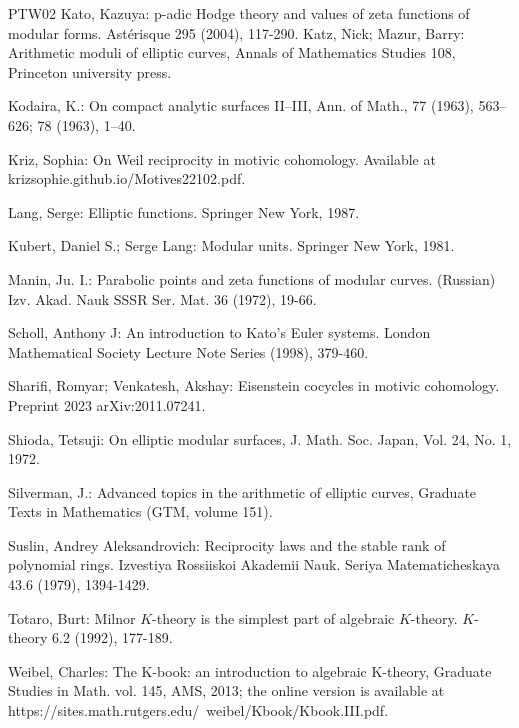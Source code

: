 \documentclass[12pt,amstex,amssymb]{article}
\theoremstyle{plain}
\theoremstyle{definition}
\def\Z{{\mathbb Z}}
\newcommand{\GL}{\operatorname{GL}}
\begin{document}
{\begin{thebibliography}{PTW02}
Kato, Kazuya:  p-adic Hodge theory and values of zeta functions of modular forms. Ast\'erisque 295 (2004), 117-290.
Katz, Nick; Mazur, Barry: Arithmetic moduli of elliptic curves, Annals of Mathematics Studies 108, Princeton university press.

Kodaira, K.: On compact analytic surfaces II--III, Ann. of Math., 77 (1963), 563--626; 78 (1963), 1--40.

Kriz, Sophia: On Weil reciprocity in motivic cohomology. Available at  krizsophie.github.io/Motives22102.pdf. 

Lang, Serge: Elliptic functions. Springer New York, 1987.

Kubert, Daniel S.; Serge Lang: Modular units. Springer New York, 1981.

Manin, Ju. I.:
Parabolic points and zeta functions of modular curves. (Russian)
Izv. Akad. Nauk SSSR Ser. Mat. 36 (1972), 19-66.

Scholl, Anthony J: An introduction to Kato's Euler systems. London Mathematical Society Lecture Note Series (1998), 379-460.

Sharifi, Romyar; Venkatesh, Akshay: Eisenstein cocycles in motivic cohomology. Preprint 2023 arXiv:2011.07241.

Shioda, Tetsuji: On elliptic modular surfaces, J. Math. Soc. Japan, Vol. 24, No. 1, 1972.

Silverman, J.: Advanced topics in the arithmetic of elliptic curves, Graduate Texts in Mathematics (GTM, volume 151).

Suslin, Andrey Aleksandrovich: Reciprocity laws and the stable rank of polynomial rings. Izvestiya Rossiiskoi Akademii Nauk. Seriya Matematicheskaya 43.6 (1979), 1394-1429.

 Totaro, Burt: Milnor $K$-theory is the simplest part of algebraic $K$-theory. $K$-theory 6.2 (1992), 177-189.

 Weibel, Charles: The K-book: an introduction to algebraic K-theory, Graduate Studies in Math. vol. 145, AMS, 2013; 
the online version is available at https://sites.math.rutgers.edu/~weibel/Kbook/Kbook.III.pdf.


\end{thebibliography}}
\end{document}
